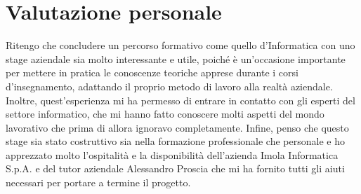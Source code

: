 
\section{Valutazione personale}\label{sec:valutazione-personale}
Ritengo che concludere un percorso formativo come quello d’Informatica con uno stage aziendale sia molto interessante e utile, poiché è un’occasione importante per mettere in pratica le conoscenze teoriche apprese durante i corsi d’insegnamento, adattando il proprio metodo di lavoro alla realtà aziendale.
Inoltre, quest’esperienza mi ha permesso di entrare in contatto con gli esperti del settore informatico, che mi hanno fatto conoscere molti aspetti del mondo lavorativo che prima di allora ignoravo completamente.
Infine, penso che questo stage sia stato costruttivo sia nella formazione professionale che personale e ho apprezzato molto l’ospitalità e la disponibilità dell’azienda Imola Informatica S.p.A. e del tutor aziendale Alessandro Proscia che mi ha fornito tutti gli aiuti necessari per portare a termine il progetto.
